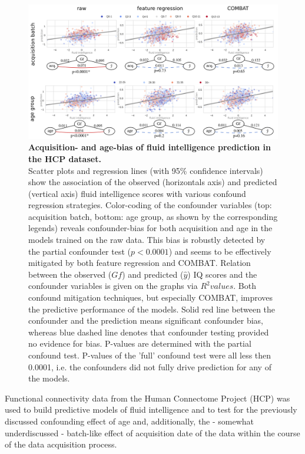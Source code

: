 \documentclass{article}
\begin{document}
\begin{figure}[!b]
  \centering
  \includegraphics[width=0.75\paperwidth]{fig/fig_hcp.png}
  \caption{\textbf{Acquisition- and age-bias of fluid intelligence prediction in the HCP dataset.} \\
  Scatter plots and regression lines (with 95\% confidence intervals) show the association of the observed (horizontals axis) and predicted (vertical axis) fluid intelligence scores with various confound regression strategies. Color-coding of the confounder variables (top: acquisition batch, bottom: age group, as shown by the corresponding legends) reveals confounder-bias for both acquisition and age in the models trained on the raw data. This bias is robustly detected by the partial confounder test ($p<0.0001$) and seems to be effectively mitigated by both feature regression and COMBAT.
  Relation between the observed ($Gf$) and predicted ($\hat{y}$) IQ scores and the confounder variables is given on the graphs via $R^2 values$. Both confound mitigation techniques, but especially COMBAT, improves the predictive performance of the models.
  Solid red line between the confounder and the prediction means significant confounder bias, whereas blue dashed line denotes that confounder testing provided no evidence for bias. P-values are determined with the partial confound test. P-values of the 'full' confound test were all less then 0.0001, i.e. the confounders did not fully drive prediction for any of the models.
  }
  \label{fig:hcp}
\end{figure}

Functional connectivity data from the Human Connectome Project (HCP)\citep{van2013wu} was used to build predictive models of fluid intelligence and to test for the previously discussed confounding effect of age\citep{lohmann2021predicting, dubois2018distributed} and,  additionally, the - somewhat underdiscussed - batch-like effect of acquisition date of the data within the course of the data acquisition process.
\end{document}
